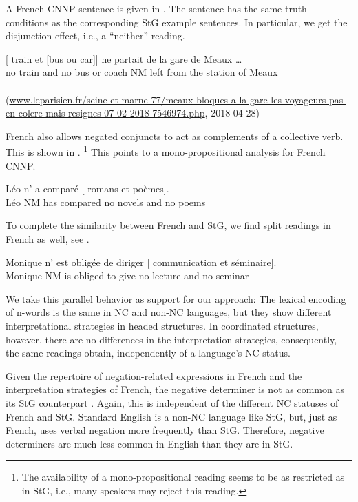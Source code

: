 \documentclass[output=paper]{langsci/langscibook}
\begin{document}
A French CNNP-sentence is given in . The sentence has the same truth conditions as the corresponding StG example sentences.
In particular, we get the disjunction effect, i.e., a ``neither'' reading.


\ea \label{Meaux}
\gll 
{}[ train et  [bus ou car]] ne partait de la gare de Meaux \ldots\\
no train and no bus or coach NM left from the station of Meaux\\
\glt {}\\
(\url{www.leparisien.fr/seine-et-marne-77/meaux-bloques-a-la-gare-les-voyageurs-pas-en-colere-mais-resignes-07-02-2018-7546974.php}, 2018-04-28)
\z 

French also allows negated conjuncts to act as 
complements of a collective verb.
This is shown in .%
\footnote{The availability of a mono-propositional reading seems to be as restricted as in StG, i.e., many speakers may reject this reading.}
This points to a mono-propositional analysis for French CNNP. 

\ea \label{roman-poeme}
\gll Léo n' a comparé [ romans et  poèmes].\\
Léo NM has compared \hphantom{[}no novels and no poems\\
\glt {}
\z 

To complete the similarity between French and StG, we find split readings in French as well, see .

\ea \label{fr-Monique}
\gll Monique n' est obligée de diriger [ communication et  séminaire].\\
Monique NM is obliged to give \hphantom{[}no lecture and no seminar\\
\glt {}
\z 

We take this parallel behavior as support for our approach: The lexical encoding of n-words is the same in NC and non-NC languages, but they show different interpretational strategies in headed structures. 
In coordinated structures, however, there are no differences in the interpretation strategies, consequently, the same readings obtain, independently of a language's NC status.

Given the repertoire of negation-related expressions in French and the interpretation strategies of French, the negative determiner  is not as common as its StG counterpart . 
Again, this is independent of the different NC statuses of French and StG. 
Standard English is a non-NC language like StG, but, just as French, uses verbal negation 
more frequently than StG. 
Therefore, negative determiners are much less common in English than they are in StG. 
\end{document}
